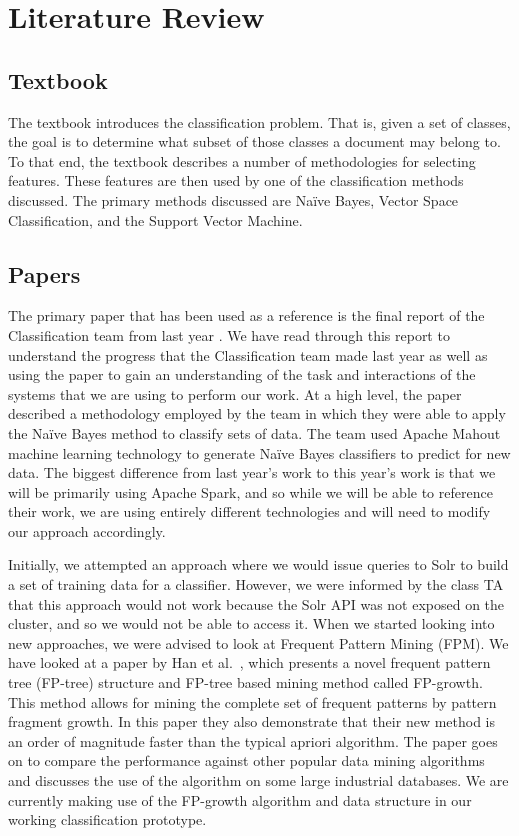 \chapter{Literature Review}\label{ch:literatureReview}

\section{Textbook}
The textbook \cite{manning2008introduction} introduces the classification problem. That is, given a set of classes, the goal is to determine what subset of those classes a document may belong to. To that end, the textbook describes a number of methodologies for selecting features. These features are then used by one of the classification methods discussed. The primary methods discussed are Na\"{i}ve Bayes, Vector Space Classification, and the Support Vector Machine.

\section{Papers}
The primary paper that has been used as a reference is the final report of the Classification team from last year \cite{cui2015classification}. We have read through this report to understand the progress that the Classification team made last year as well as using the paper to gain an understanding of the task and interactions of the systems that we are using to perform our work. At a high level, the paper described a methodology employed by the team in which they were able to apply the Na{\"i}ve Bayes method to classify sets of data. The team used Apache Mahout machine learning technology to generate Na{\"i}ve Bayes classifiers to predict for new data. The biggest difference from last year's work to this year's work is that we will be primarily using Apache Spark, and so while we will be able to reference their work, we are using entirely different technologies and will need to modify our approach accordingly.

Initially, we attempted an approach where we would issue queries to Solr to build a set of training data for a classifier. However, we were informed by the class TA that this approach would not work because the Solr API was not exposed on the cluster, and so we would not be able to access it. When we started looking into new approaches, we were advised to look at Frequent Pattern Mining (FPM). We have looked at a paper by Han et al.\ \cite{han2000mining}, which presents a novel frequent pattern tree (FP-tree) structure and FP-tree based mining method called FP-growth. This method allows for mining the complete set of frequent patterns by pattern fragment growth. In this paper they also demonstrate that their new method is an order of magnitude faster than the typical apriori algorithm. The paper goes on to compare the performance against other popular data mining algorithms and discusses the use of the algorithm on some large industrial databases. We are currently making use of the FP-growth algorithm and data structure in our working classification prototype.